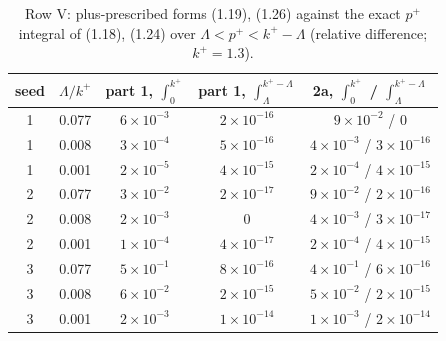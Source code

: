 \documentclass[10pt]{article}
\numberwithin{equation}{section}
\begin{document}
\begin{table}[H]\centering\small
\begin{tabular}{@{}ccccc@{}}\toprule
seed & $\Lambda/k^+$ & part 1, $\int_0^{k^+}$ & part 1, $\int_\Lambda^{k^+-\Lambda}$ & 2a, $\int_0^{k^+}$ \quad / \quad $\int_\Lambda^{k^+-\Lambda}$\\\midrule
1 & 0.077 & $6\times10^{-3}$ & $2\times10^{-16}$ & $9\times10^{-2}$ \quad / \quad $0$\\
1 & 0.008 & $3\times10^{-4}$ & $5\times10^{-16}$ & $4\times10^{-3}$ \quad / \quad $3\times10^{-16}$\\
1 & 0.001 & $2\times10^{-5}$ & $4\times10^{-15}$ & $2\times10^{-4}$ \quad / \quad $4\times10^{-15}$\\
2 & 0.077 & $3\times10^{-2}$ & $2\times10^{-17}$ & $9\times10^{-2}$ \quad / \quad $2\times10^{-16}$\\
2 & 0.008 & $2\times10^{-3}$ & $0$ & $4\times10^{-3}$ \quad / \quad $3\times10^{-17}$\\
2 & 0.001 & $1\times10^{-4}$ & $4\times10^{-17}$ & $2\times10^{-4}$ \quad / \quad $4\times10^{-15}$\\
3 & 0.077 & $5\times10^{-1}$ & $8\times10^{-16}$ & $4\times10^{-1}$ \quad / \quad $6\times10^{-16}$\\
3 & 0.008 & $6\times10^{-2}$ & $2\times10^{-15}$ & $5\times10^{-2}$ \quad / \quad $2\times10^{-15}$\\
3 & 0.001 & $2\times10^{-3}$ & $1\times10^{-14}$ & $1\times10^{-3}$ \quad / \quad $2\times10^{-14}$\\
\bottomrule\end{tabular}
\caption{Row V: plus-prescribed forms (1.19), (1.26) against the exact $p^+$ integral of (1.18), (1.24) over $\Lambda<p^+<k^+-\Lambda$ (relative difference; $k^+=1.3$).}\label{tab:Vplus}
\end{table}
\end{document}
